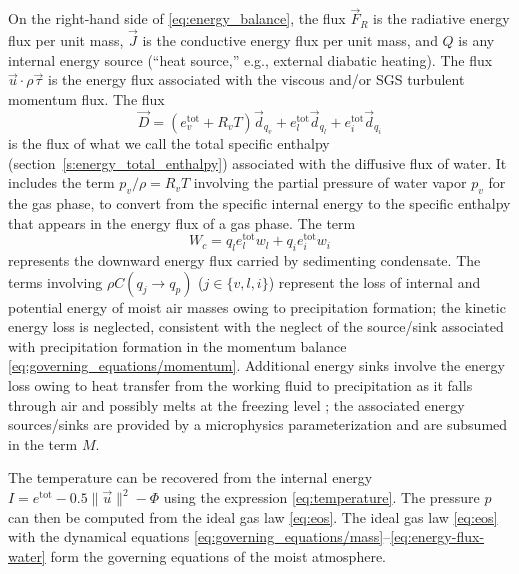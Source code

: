 \documentclass{report}
\begin{document}
On the right-hand side of \eqref{eq:energy_balance}, the flux $\vec{F}_R$ is the radiative energy flux per unit mass, $\vec{J}$ is the conductive energy flux per unit mass, and $Q$ is any internal energy source (``heat source,'' e.g., external diabatic heating). The flux $\vec{u} \cdot \rho\vec{\tau}$ is the energy flux associated with the viscous and/or SGS turbulent momentum flux. The flux 
\begin{equation}\label{eq:energy-flux-water}
\vec{D} = (e_v^{\mathrm{tot}} + R_v T) \vec{d}_{q_v} + e_l^{\mathrm{tot}} \vec{d}_{q_l} +  e_i^{\mathrm{tot}} \vec{d}_{q_i}
\end{equation}
is the flux of what we call the total specific enthalpy (section~\ref{s:energy_total_enthalpy}) associated with the diffusive flux of water. It includes the term $p_v/\rho = R_v T$ involving the partial pressure of water vapor $p_v$ for the gas phase, to convert from the specific internal energy to the specific enthalpy that appears in the energy flux of a gas phase. The term 
\begin{equation}
W_c = q_l e_l^{\mathrm{tot}} w_l + q_i e_i^{\mathrm{tot}} w_i
\end{equation}
represents the downward energy flux carried by sedimenting condensate. The terms involving $\rho C(q_j \rightarrow q_p)$ ($j \in \{ v, l, i \}$) represent the loss of internal and potential energy of moist air masses owing to precipitation formation; the kinetic energy loss is neglected, consistent with the neglect of the source/sink associated with precipitation formation in the momentum balance \eqref{eq:governing_equations/momentum}. Additional energy sinks involve the energy loss owing to heat transfer from the working fluid to precipitation as it falls through air and possibly melts at the freezing level \citep{Raymond13b}; the associated energy sources/sinks are provided by a microphysics parameterization and are subsumed in the term $M$. 

The temperature can be recovered from the internal energy $I = e^{\mathrm{tot}} - 0.5 \| \vec{u} \|^2 - \Phi$ using the expression \eqref{eq:temperature}. The pressure $p$ can then be computed from the ideal gas law \eqref{eq:eos}. The ideal gas law \eqref{eq:eos} with the dynamical equations \eqref{eq:governing_equations/mass}--\eqref{eq:energy-flux-water} form the governing equations of the moist atmosphere.
\end{document}
